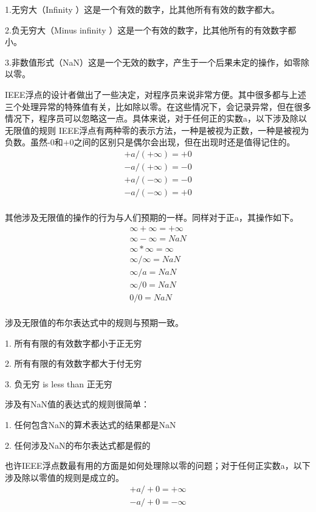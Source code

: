 1.无穷大（Infinity ）这是一个有效的数字，比其他所有有效的数字都大。

2.负无穷大（Minus infinity ）这是一个有效的数字，比其他所有的有效数字都小。

3.非数值形式（NaN）这是一个无效的数字，产生于一个后果未定的操作，如零除以零。

IEEE浮点的设计者做出了一些决定，对程序员来说非常方便。其中很多都与上述三个处理异常的特殊值有关，比如除以零。在这些情况下，会记录异常，但在很多情况下，程序员可以忽略这一点。具体来说，对于任何正的实数a，以下涉及除以无限值的规则 IEEE浮点有两种零的表示方法，一种是被视为正数，一种是被视为负数。虽然-0和+0之间的区别只是偶尔会出现，但在出现时还是值得记住的。
\begin{equation}
	\begin{aligned}	
		+a/(+\infty)=+0\\
		-a/(+\infty)=-0\\
		+a/(-\infty)=-0\\
		-a/(-\infty)=+0\\
	\end{aligned}	
\end{equation}

其他涉及无限值的操作的行为与人们预期的一样。同样对于正a，其操作如下。
\begin{equation}
	\begin{aligned}	
		\infty+\infty=+\infty\\
		\infty-\infty=NaN\\
		\infty*\infty=\infty\\
		\infty/\infty=NaN \\
		\infty/a=NaN \\
		\infty/0=NaN \\
		0/0=NaN \\
	\end{aligned}	
\end{equation}

涉及无限值的布尔表达式中的规则与预期一致。

1. 所有有限的有效数字都小于正无穷

2. 所有有限的有效数字都大于付无穷

3. 负无穷 is less than 正无穷

涉及有NaN值的表达式的规则很简单：

1. 任何包含NaN的算术表达式的结果都是NaN

2. 任何涉及NaN的布尔表达式都是假的

也许IEEE浮点数最有用的方面是如何处理除以零的问题；对于任何正实数a，以下涉及除以零值的规则是成立的。
\begin{equation}\label{key}
	\begin{aligned}	
		+a/+0=+	\infty\\
		-a/+0=-	\infty
	\end{aligned}
\end{equation}

